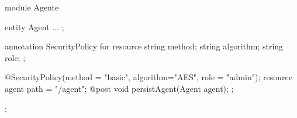 module Agente {
 
 entity Agent { 
   ...
 };

 annotation SecurityPolicy for resource {
   string method;
   string algorithm;
   string role;
 };

 @SecurityPolicy(method = "basic", 
                 algorithm="AES", 
                 role = "admin");
 resource agent {
   path = "/agent";
   @post void persistAgent(Agent agent);
 };
};